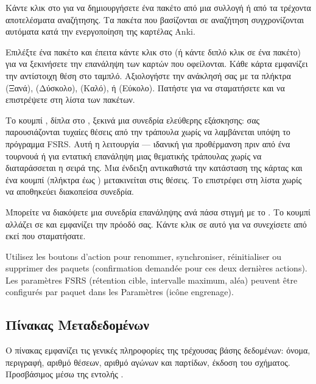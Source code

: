 \documentclass[letterpaper,10pt,greek]{sphinxmanual}
\begin{document}
\sphinxAtStartPar
{} Κάντε κλικ στο  για να δημιουργήσετε ένα πακέτο από μια συλλογή ή από τα τρέχοντα αποτελέσματα αναζήτησης. Τα πακέτα που βασίζονται σε αναζήτηση συγχρονίζονται αυτόματα κατά την ενεργοποίηση της καρτέλας Anki.

\sphinxAtStartPar
{} Επιλέξτε ένα πακέτο και έπειτα κάντε κλικ στο  (ή κάντε διπλό κλικ σε ένα πακέτο) για να ξεκινήσετε την επανάληψη των καρτών που οφείλονται. Κάθε κάρτα εμφανίζει την αντίστοιχη θέση στο ταμπλό. Αξιολογήστε την ανάκλησή σας με τα πλήκτρα  (Ξανά),  (Δύσκολο),  (Καλό), ή  (Εύκολο). Πατήστε  για να σταματήσετε και να επιστρέψετε στη λίστα των πακέτων.

\sphinxAtStartPar
{} Το κουμπί , δίπλα στο , ξεκινά μια συνεδρία ελεύθερης εξάσκησης: σας παρουσιάζονται τυχαίες θέσεις από την τράπουλα χωρίς να λαμβάνεται υπόψη το πρόγραμμα FSRS. Αυτή η λειτουργία  — ιδανική για προθέρμανση πριν από ένα τουρνουά ή για εντατική επανάληψη μιας θεματικής τράπουλας χωρίς να διαταράσσεται η σειρά της. Μια ένδειξη  αντικαθιστά την κατάσταση της κάρτας και ένα κουμπί  (πλήκτρα  έως ) μετακινείται στις θέσεις. Το  επιστρέφει στη λίστα χωρίς να αποθηκεύει διακοπείσα συνεδρία.

\sphinxAtStartPar
{} Μπορείτε να διακόψετε μια συνεδρία επανάληψης ανά πάσα στιγμή με το . Το κουμπί αλλάζει σε  και εμφανίζει την πρόοδό σας. Κάντε κλικ σε αυτό για να συνεχίσετε από εκεί που σταματήσατε.

\sphinxAtStartPar
{} Utilisez les boutons d’action pour renommer,
synchroniser, réinitialiser ou supprimer des paquets (confirmation demandée
pour ces deux dernières actions). Les paramètres FSRS (rétention cible,
intervalle maximum, aléa) peuvent être configurés par paquet dans les
Paramètres (icône engrenage).


\subsection{Πίνακας Μεταδεδομένων}
\label{\detokenize{manuel:panneau-metadonnees}}\label{\detokenize{manuel:panneau-metadata}}
\sphinxAtStartPar
Ο πίνακας  εμφανίζει τις γενικές πληροφορίες της τρέχουσας βάσης δεδομένων: όνομα, περιγραφή, αριθμό θέσεων, αριθμό αγώνων και παρτίδων, έκδοση του σχήματος. Προσβάσιμος μέσω της εντολής .
\end{document}
